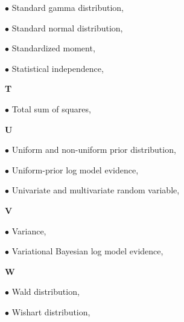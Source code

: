\documentclass[a4paper,12pt,twoside]{book}
\begin{document}
$\bullet$ Standard gamma distribution, \pageref{sec:sgam}

$\bullet$ Standard normal distribution, \pageref{sec:snorm}

$\bullet$ Standardized moment, \pageref{sec:mom-stand}

$\bullet$ Statistical independence, \pageref{sec:ind}


\vspace{1em}
\textbf{T}

$\bullet$ Total sum of squares, \pageref{sec:tss}


\vspace{1em}
\textbf{U}

$\bullet$ Uniform and non-uniform prior distribution, \pageref{sec:prior-uni}

$\bullet$ Uniform-prior log model evidence, \pageref{sec:uplme}

$\bullet$ Univariate and multivariate random variable, \pageref{sec:rvar-uni}


\vspace{1em}
\textbf{V}

$\bullet$ Variance, \pageref{sec:var}

$\bullet$ Variational Bayesian log model evidence, \pageref{sec:vblme}


\vspace{1em}
\textbf{W}

$\bullet$ Wald distribution, \pageref{sec:wald}

$\bullet$ Wishart distribution, \pageref{sec:wish}
\end{document}
